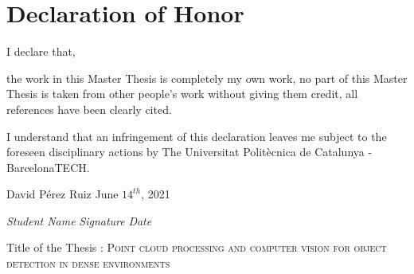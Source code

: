 \documentclass[../main.tex]{subfiles}
\begin{document}
\section*{Declaration of Honor}

\vspace{1em}

I declare that,

\vspace{1em}

the work in this Master Thesis is completely my own work, no part of this Master Thesis is taken from other people’s work without giving them credit, all references have been clearly cited.

\vspace{1em}

I understand that an infringement of this declaration leaves me subject to the foreseen disciplinary actions by The Universitat Politècnica de Catalunya - BarcelonaTECH.

\vspace{6em}

David Pérez Ruiz    \hspace{9cm}     June $14^{th}$, 2021

\vspace{2em}

\textit{Student Name}    \hspace{4.5cm}    \textit{Signature}       \hspace{4.5cm} \textit{Date}

\vspace{10em}

Title of the Thesis : \textsc{\large{Point cloud processing and computer vision for object detection in dense environments}}
\end{document}
